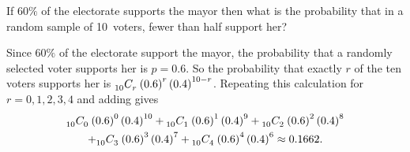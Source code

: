 \documentclass[answers,12pt]{exam}
\newcommand\ncr[2]{\tensor[_{#1}]C{_{#2}}}
\begin{document}
\begin{questions}
\question If $60\%$ of the electorate supports the mayor
then what is the probability that in a random sample
of 10~voters, fewer than half support her?
\begin{solution} Since $60\%$ of the electorate support the mayor,
the probability that a randomly selected voter supports her
is $p=0.6$. So the probability that exactly $r$ of the ten voters
supports her is $\ncr{10}{r}\left(0.6\right)^r\left(0.4\right)^{10-r}$.
Repeating this calculation for $r=0,1,2,3,4$ and adding gives
\begin{multline*}
\ncr{10}{0}\left(0.6\right)^0\left(0.4\right)^{10}
+\ncr{10}{1}\left(0.6\right)^1\left(0.4\right)^9
+\ncr{10}{2}\left(0.6\right)^2\left(0.4\right)^8\\
+\ncr{10}{3}\left(0.6\right)^3\left(0.4\right)^7
+\ncr{10}{4}\left(0.6\right)^4\left(0.4\right)^6
\approx 0.1662.
\end{multline*}
\end{solution}
\end{questions}
\end{document}
